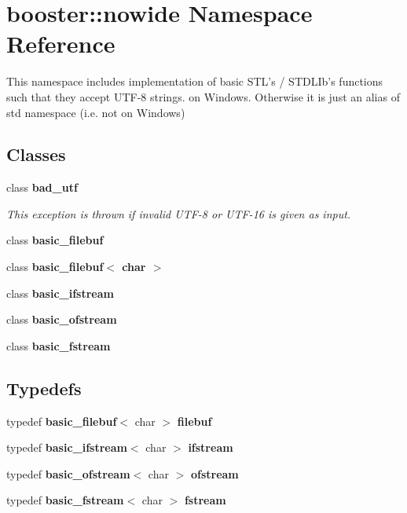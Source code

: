 \section{booster\-:\-:nowide Namespace Reference}
\label{namespacebooster_1_1nowide}


This namespace includes implementation of basic S\-T\-L's / S\-T\-D\-L\-Ib's functions such that they accept U\-T\-F-\/8 strings. on Windows. Otherwise it is just an alias of std namespace (i.\-e. not on Windows)  


\subsection*{Classes}
\begin{DoxyCompactItemize}
\item 
class {\bf bad\-\_\-utf}
\begin{DoxyCompactList}\small\item\em This exception is thrown if invalid U\-T\-F-\/8 or U\-T\-F-\/16 is given as input. \end{DoxyCompactList}\item 
class {\bf basic\-\_\-filebuf}
\item 
class {\bf basic\-\_\-filebuf$<$ char $>$}
\item 
class {\bf basic\-\_\-ifstream}
\item 
class {\bf basic\-\_\-ofstream}
\item 
class {\bf basic\-\_\-fstream}
\end{DoxyCompactItemize}
\subsection*{Typedefs}
\begin{DoxyCompactItemize}
\item 
typedef {\bf basic\-\_\-filebuf}$<$ char $>$ {\bf filebuf}
\item 
typedef {\bf basic\-\_\-ifstream}$<$ char $>$ {\bf ifstream}
\item 
typedef {\bf basic\-\_\-ofstream}$<$ char $>$ {\bf ofstream}
\item 
typedef {\bf basic\-\_\-fstream}$<$ char $>$ {\bf fstream}
\end{DoxyCompactItemize}
